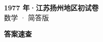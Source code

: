\documentclass[zihao=-4, a4paper]{ctexart}
\begin{document}
\begin{center}
  {\Large\bfseries 1977 年·江苏扬州地区初试卷}\\[4pt]
  {\large 数学 · 简答版}
\end{center}
\medskip
{}

\clearpage
{}
\begin{center}{\Large\bfseries 答案速查}\end{center}
\medskip

\end{document}

